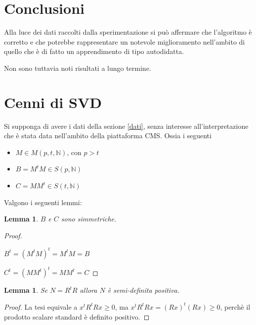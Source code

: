 \documentclass[12pt,a4paper]{article}
\theoremstyle{thm}
\newtheorem{lemma}[theorem]{Lemma}
\theoremstyle{def}
\begin{document}
\section{Conclusioni}
Alla luce dei dati raccolti dalla sperimentazione si può affermare che l'algoritmo è corretto e che potrebbe rappresentare un notevole miglioramento nell'ambito di quello che è di fatto un apprendimento di tipo autodidatta.

Non sono tuttavia noti risultati a lungo termine.


\newpage
\appendix

\section{Cenni di SVD}
\label{appendice1}
Si supponga di avere i dati della sezione \ref{dati}, senza interesse all'interpretazione che è stata data nell'ambito della piattaforma CMS. Ossia i seguenti
\begin{itemize}
\item $M \in M(p,t,\mathds{N})$, con $p > t$
\item $B=M^tM \in S(p, \mathds{N})$
\item $C=MM^t \in S(t, \mathds{N})$
\end{itemize}

Valgono i seguenti lemmi:

\begin{lemma}
$B$ e $C$ sono simmetriche.
\end{lemma}

\begin{proof}~

$B^t = (M^tM)^t = M^tM = B$

$C^t = (MM^t)^t = MM^t = C$ 
\end{proof}

\begin{lemma}
Se $N = R^t R$ allora $N$ è semi-definita positiva.
\end{lemma}
\begin{proof}
La tesi equivale a $x^tR^tRx \ge 0$, ma $x^tR^tRx = (Rx)^t (Rx) \ge 0$, perchè il prodotto scalare standard è definito positivo. 
\end{proof}

\vspace{0.5cm}
\end{document}

